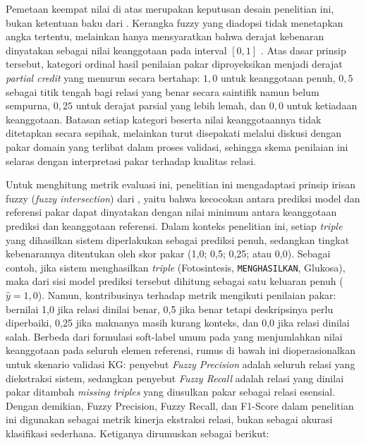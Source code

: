 \documentclass[../../thesis]{subfiles}
\begin{document}
Pemetaan keempat nilai di atas merupakan keputusan desain penelitian ini,
bukan ketentuan baku dari \textcite{harju_evaluating_2023}. Kerangka fuzzy yang
diadopsi tidak menetapkan angka tertentu, melainkan hanya mensyaratkan bahwa
derajat kebenaran dinyatakan sebagai nilai keanggotaan pada interval $[0,1]$
\parencite{harju_evaluating_2023}. Atas dasar prinsip tersebut, kategori
ordinal hasil penilaian pakar diproyeksikan menjadi derajat \textit{partial
credit} yang menurun secara bertahap: $1{,}0$ untuk keanggotaan penuh, $0{,}5$
sebagai titik tengah bagi relasi yang benar secara saintifik namun belum
sempurna, $0{,}25$ untuk derajat parsial yang lebih lemah, dan $0{,}0$ untuk
ketiadaan keanggotaan. Batasan setiap kategori beserta nilai keanggotaannya tidak
ditetapkan secara sepihak, melainkan turut disepakati melalui diskusi dengan
pakar domain yang terlibat dalam proses validasi, sehingga skema penilaian ini
selaras dengan interpretasi pakar terhadap kualitas relasi.

Untuk menghitung metrik evaluasi ini, penelitian ini mengadaptasi prinsip irisan
fuzzy (\textit{fuzzy intersection}) dari \textcite{harju_evaluating_2023}, yaitu
bahwa kecocokan antara prediksi model dan referensi pakar dapat dinyatakan
dengan nilai minimum antara keanggotaan prediksi dan keanggotaan referensi.
Dalam konteks penelitian ini, setiap \textit{triple} yang dihasilkan sistem
diperlakukan sebagai prediksi penuh, sedangkan tingkat kebenarannya ditentukan
oleh skor pakar (1{,}0; 0{,}5; 0{,}25; atau 0{,}0). Sebagai contoh, jika sistem
menghasilkan \textit{triple} (Fotosintesis, \texttt{MENGHASILKAN}, Glukosa),
maka dari sisi model prediksi tersebut dihitung sebagai satu keluaran penuh
($\hat{y}=1{,}0$). Namun, kontribusinya terhadap metrik mengikuti penilaian
pakar: bernilai 1{,}0 jika relasi dinilai benar, 0{,}5 jika benar tetapi
deskripsinya perlu diperbaiki, 0{,}25 jika maknanya masih kurang konteks, dan
0{,}0 jika relasi dinilai salah. Berbeda dari formulasi
soft-label umum pada \textcite{harju_evaluating_2023} yang menjumlahkan nilai
keanggotaan pada seluruh elemen referensi, rumus di bawah ini dioperasionalkan
untuk skenario validasi KG: penyebut \textit{Fuzzy Precision} adalah seluruh
relasi yang diekstraksi sistem, sedangkan penyebut \textit{Fuzzy Recall} adalah
relasi yang dinilai pakar ditambah \textit{missing triples} yang diusulkan pakar
sebagai relasi esensial. Dengan demikian, Fuzzy Precision, Fuzzy Recall, dan
F1-Score dalam penelitian ini digunakan sebagai metrik kinerja ekstraksi relasi,
bukan sebagai akurasi klasifikasi sederhana. Ketiganya dirumuskan sebagai
berikut:
\end{document}
